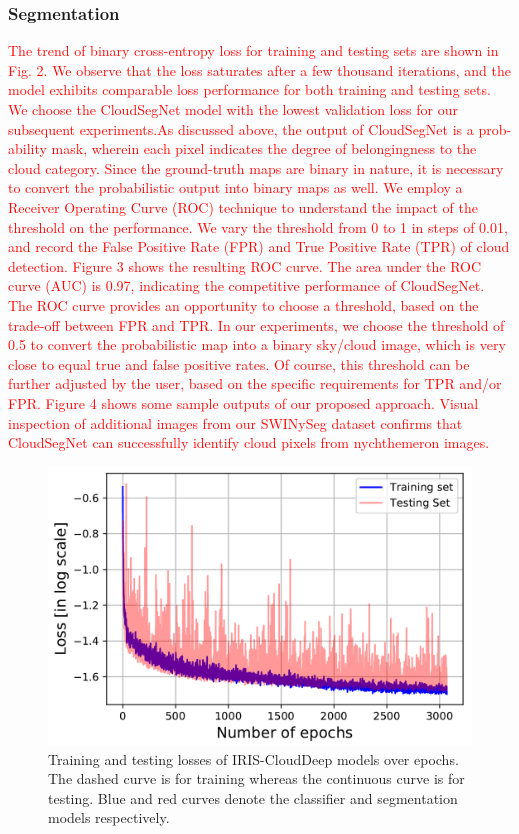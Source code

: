 \documentclass[amt, article]{copernicus}
\begin{document}
\subsubsection{Segmentation}

\textcolor{red}{The trend of binary cross-entropy loss for training and testing sets are shown in Fig. 2. We observe that the loss saturates after
a few thousand iterations, and the model exhibits comparable
loss performance for both training and testing sets. We choose
the CloudSegNet model with the lowest validation loss for our
subsequent experiments.As discussed above, the output of CloudSegNet is a prob-ability mask, wherein each pixel indicates the degree of belongingness to the cloud category. Since the ground-truth maps are binary in nature, it is necessary to convert the probabilistic output into binary maps as well. We employ a Receiver Operating Curve (ROC) technique to understand the impact of the threshold on the performance. We vary the threshold from 0 to 1 in steps of 0.01, and record the False Positive Rate (FPR) and True Positive Rate (TPR) of cloud detection. Figure 3 shows the resulting ROC curve. The area under the ROC curve (AUC) is 0.97, indicating the competitive performance of CloudSegNet. The ROC curve provides an opportunity to choose a threshold, based on the trade-off between FPR and TPR. In our experiments, we choose the threshold of 0.5 to convert the probabilistic map into a binary sky/cloud image, which is very close to equal true and false positive rates. Of course, this threshold can be further adjusted by the user, based on the specific requirements for TPR and/or FPR. Figure 4 shows some sample outputs of our proposed approach. Visual inspection of additional images from our SWINySeg dataset confirms that CloudSegNet can successfully identify cloud pixels from nychthemeron images.}

\begin{figure}[t]
	\includegraphics[width=\hsize]{figures/loss_trend.png}
	\caption{Training and testing losses of IRIS-CloudDeep models over
    epochs. The dashed curve is for training whereas the continuous curve is for testing. Blue and red curves denote the classifier and segmentation models respectively.}
    \label{fig:loss_trend}
\end{figure}
\end{document}
